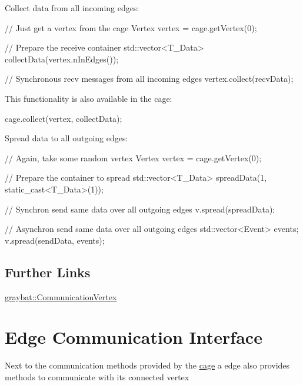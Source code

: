 \begin{DoxyEnumerate}
\item Collect data from all incoming edges\+: 
\begin{DoxyCode}
\textcolor{comment}{// Just get a vertex from the cage}
Vertex vertex = cage.getVertex(0);

\textcolor{comment}{// Prepare the receive container}
std::vector<T\_Data> collectData(vertex.nInEdges());

\textcolor{comment}{// Synchronous recv messages from all incoming edges}
vertex.collect(recvData);
\end{DoxyCode}
 This functionality is also available in the cage\+: 
\begin{DoxyCode}
cage.collect(vertex, collectData);
\end{DoxyCode}

\item Spread data to all outgoing edges\+: 
\begin{DoxyCode}
\textcolor{comment}{// Again, take some random vertex}
Vertex vertex = cage.getVertex(0);

\textcolor{comment}{// Prepare the container to spread}
std::vector<T\_Data> spreadData(1, static\_cast<T\_Data>(1));

\textcolor{comment}{// Synchron send same data over all outgoing edges}
v.spread(spreadData);

\textcolor{comment}{// Asynchron send same data over all outgoing edges}
std::vector<Event> events;
v.spread(sendData, events);
\end{DoxyCode}

\end{DoxyEnumerate}

\subsection*{Further Links}


\begin{DoxyItemize}
\item \hyperlink{structgraybat_1_1CommunicationVertex}{graybat\+::\+Communication\+Vertex} 
\end{DoxyItemize}\hypertarget{edge}{}\section{Edge Communication Interface}\label{edge}
Next to the communication methods provided by the \hyperlink{cage}{cage} a edge also provides methods to communicate with its connected vertex


